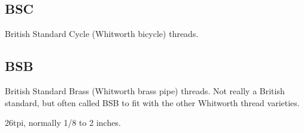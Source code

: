 

\subsection{BSC}
British Standard Cycle (Whitworth bicycle) threads.
\clearpage

\subsection{BSB}
British Standard Brass (Whitworth brass pipe) threads.  Not really a British standard, but often called BSB to fit with the other Whitworth thread varieties.

26tpi, normally 1/8 to 2 inches.
\clearpage

